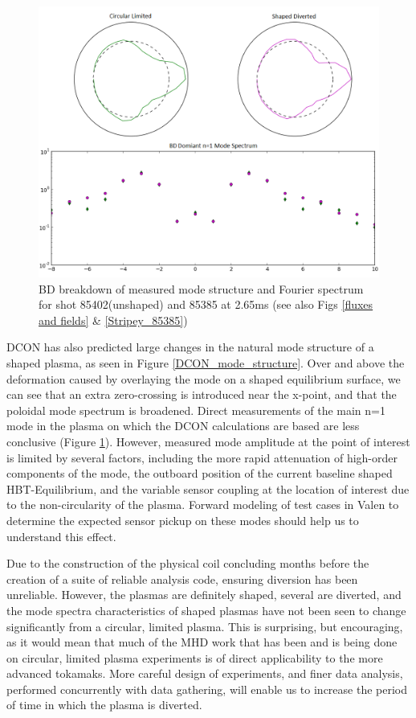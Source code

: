 \documentclass[aps,prl,twocolumn,superscriptaddress,groupedaddress]{revtex4}  %
\begin{document}
	\begin{figure}[htb]
	\centering
\includegraphics[scale=.3]{../Plots/BD_surfaces_n1_dom_85385_85402.png}\caption{BD breakdown of measured mode structure and Fourier spectrum for shot 85402(unshaped) and 85385 at 2.65ms (see also Figs \ref{fluxes and fields} \& \ref{Stripey_85385})}
	\label{BD_mode_structure}
	\end{figure}
	
	DCON has also predicted large changes in the natural mode structure of a shaped plasma, as seen in Figure \ref{DCON_mode_structure}.  Over and above the deformation caused by overlaying the mode on a shaped equilibrium surface, we can see that an extra zero-crossing is introduced near the x-point, and that the poloidal mode spectrum is broadened.  Direct measurements of the main n=1 mode in the plasma on which the DCON calculations are based are less conclusive (Figure \ref{BD_mode_structure}).  However, measured mode amplitude at the point of interest is limited by several factors, including the more rapid attenuation of high-order components of the mode, the outboard position of the current baseline shaped HBT-Equilibrium, and the variable sensor coupling at the location of interest due to the non-circularity of the plasma.  Forward modeling of test cases in Valen to determine the expected sensor pickup on these modes should help us to understand this effect.\par
	Due to the construction of the physical coil concluding months before the creation of a suite of reliable analysis code, ensuring diversion has been unreliable.   However, the plasmas are definitely shaped, several are diverted, and the mode spectra characteristics of shaped plasmas have not been seen to change significantly from a circular, limited plasma.  This is surprising, but encouraging, as it would mean that much of the MHD work that has been and is being done on circular, limited plasma experiments is of direct applicability to the more advanced tokamaks.  More careful design of experiments, and finer data analysis, performed concurrently with data gathering, will enable us to increase the period of time in which the plasma is diverted.
\end{document}
